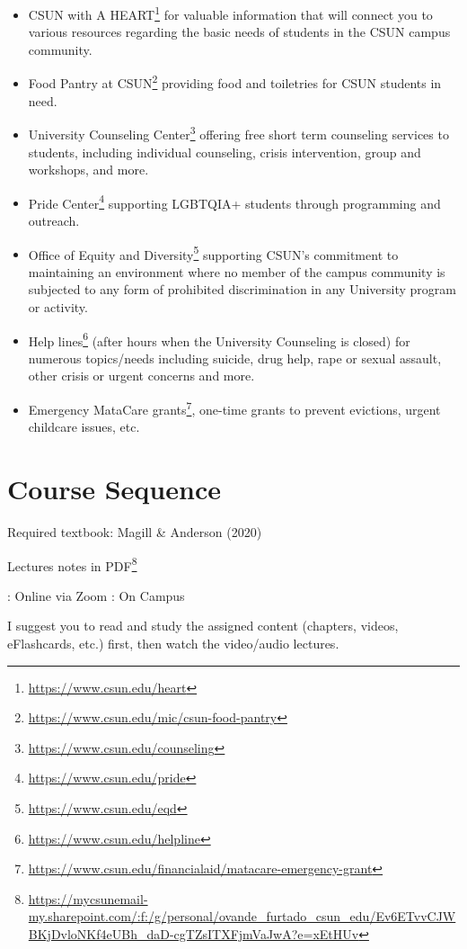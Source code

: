 \documentclass[
  letterpaper,
  DIV=11,
  numbers=noendperiod]{scrartcl}
\DeclareRobustCommand{\href}[2]{#2\footnote{\url{#1}}}
\begin{document}
\begin{itemize}
\item
  \href{https://www.csun.edu/heart}{CSUN with A HEART} for valuable
  information that will connect you to various resources regarding the
  basic needs of students in the CSUN campus community.
\item
  \href{https://www.csun.edu/mic/csun-food-pantry}{Food Pantry at CSUN}
  providing food and toiletries for CSUN students in need.
\item
  \href{https://www.csun.edu/counseling}{University Counseling Center}
  offering free short term counseling services to students, including
  individual counseling, crisis intervention, group and workshops, and
  more.
\item
  \href{https://www.csun.edu/pride}{Pride Center} supporting LGBTQIA+
  students through programming and outreach.
\item
  \href{https://www.csun.edu/eqd}{Office of Equity and Diversity}
  supporting CSUN's commitment to maintaining an environment where no
  member of the campus community is subjected to any form of prohibited
  discrimination in any University program or activity.
\item
  \href{https://www.csun.edu/helpline}{Help lines} (after hours when the
  University Counseling is closed) for numerous topics/needs including
  suicide, drug help, rape or sexual assault, other crisis or urgent
  concerns and more.
\item
  \href{https://www.csun.edu/financialaid/matacare-emergency-grant}{Emergency
  MataCare grants}, one-time grants to prevent evictions, urgent
  childcare issues, etc.
\end{itemize}

\hypertarget{course-sequence}{%
\section{Course Sequence}\label{course-sequence}}

Required textbook: Magill \& Anderson (2020)

\href{https://mycsunemail-my.sharepoint.com/:f:/g/personal/ovande_furtado_csun_edu/Ev6ETvvCJWBKjDvloNKf4eUBh_daD-cgTZsITXFjmVaJwA?e=xEtHUv}{Lectures
notes in PDF}

: Online via Zoom : On Campus

\begin{tcolorbox}[enhanced jigsaw, colbacktitle=quarto-callout-important-color!10!white, rightrule=.15mm, opacityback=0, colframe=quarto-callout-important-color-frame, leftrule=.75mm, breakable, bottomrule=.15mm, arc=.35mm, opacitybacktitle=0.6, title=\textcolor{quarto-callout-important-color}{\faExclamation}\hspace{0.5em}{Important}, titlerule=0mm, toptitle=1mm, bottomtitle=1mm, left=2mm, toprule=.15mm, colback=white, coltitle=black]

I suggest you to read and study the assigned content (chapters, videos,
eFlashcards, etc.) first, then watch the video/audio lectures.

\end{tcolorbox}
\end{document}
